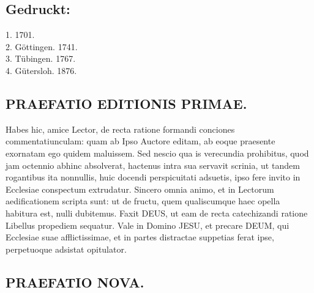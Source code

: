 \subsection*{Gedruckt:}

\begin{center}
1. 1701.\\
2. Göttingen. 1741.\\
3. Tübingen. 1767.\\
4. Gütersloh. 1876.
\end{center}

\subsection*{PRAEFATIO EDITIONIS PRIMAE.}

Habes hic, amice Lector, de recta ratione formandi conciones commentatiunculam: quam ab Ipso Auctore editam, ab eoque praesente exornatam ego quidem maluissem. Sed nescio qua is verecundia prohibitus, quod jam octennio abhinc absolverat, hactenus intra sua servavit scrinia, ut tandem rogantibus ita nonnullis, huic docendi perspicuitati adsuetis, ipso fere invito in Ecclesiae conspectum extrudatur. Sincero omnia animo, et in Lectorum aedificationem scripta sunt: ut de fructu, quem qualiscumque haec opella habitura est, nulli dubitemus. Faxit DEUS, ut eam de recta catechizandi ratione Libellus propediem sequatur. Vale in Domino JESU, et precare DEUM, qui Ecclesiae suae afflictissimae, et in partes distractae suppetias ferat ipse, perpetuoque adsistat opitulator.

\subsection*{PRAEFATIO NOVA.}

